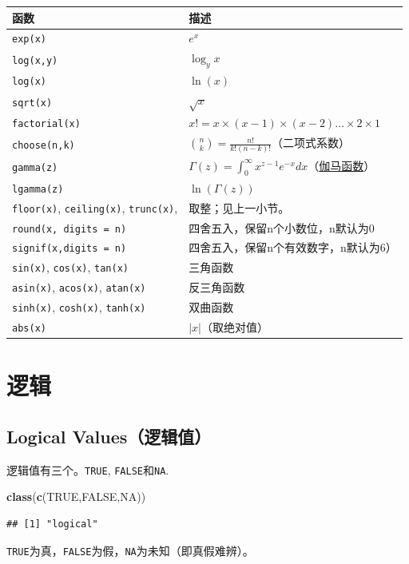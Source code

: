 \documentclass[]{book}
\newenvironment{Shaded}{\begin{snugshade}}{\end{snugshade}}
\newcommand{\KeywordTok}[1]{\textcolor[rgb]{0.13,0.29,0.53}{\textbf{#1}}}
\newcommand{\NormalTok}[1]{#1}
\newcommand{\OtherTok}[1]{\textcolor[rgb]{0.56,0.35,0.01}{#1}}
\begin{document}
\begin{longtable}[]{@{}ll@{}}
\toprule
函数 & 描述\tabularnewline
\midrule
\endhead
\texttt{exp(x)} & \(e^x\)\tabularnewline
\texttt{log(x,y)} & \(\log_yx\)\tabularnewline
\texttt{log(x)} & \(\ln(x)\)\tabularnewline
\texttt{sqrt(x)} & \(\sqrt{x}\)\tabularnewline
\texttt{factorial(x)} & \(x!=x\times(x-1)\times(x-2)\ldots\times2\times1\)\tabularnewline
\texttt{choose(n,k)} & \(\binom{n}{k}=\frac{n!}{k!(n-k)!}\)（二项式系数）\tabularnewline
\texttt{gamma(z)} & \(\Gamma(z)=\int_0^\infty x^{z-1}e^{-x}dx\)（\href{https://en.wikipedia.org/wiki/Gamma_function}{伽马函数}）\tabularnewline
\texttt{lgamma(z)} & \(\ln(\Gamma(z))\)\tabularnewline
\texttt{floor(x)}, \texttt{ceiling(x)}, \texttt{trunc(x)}, & 取整；见上一小节。\tabularnewline
\texttt{round(x,\ digits\ =\ n)} & 四舍五入，保留n个小数位，n默认为0\tabularnewline
\texttt{signif(x,digits\ =\ n)} & 四舍五入，保留n个有效数字，n默认为6）\tabularnewline
\texttt{sin(x)}, \texttt{cos(x)}, \texttt{tan(x)} & 三角函数\tabularnewline
\texttt{asin(x)}, \texttt{acos(x)}, \texttt{atan(x)} & 反三角函数\tabularnewline
\texttt{sinh(x)}, \texttt{cosh(x)}, \texttt{tanh(x)} & 双曲函数\tabularnewline
\texttt{abs(x)} & \(|x|\)（取绝对值）\tabularnewline
\bottomrule
\end{longtable}

\hypertarget{logical-operation}{%
\section{逻辑}\label{logical-operation}}

\hypertarget{logical-values}{%
\subsection{Logical Values（逻辑值）}\label{logical-values}}

逻辑值有三个。\texttt{TRUE}, \texttt{FALSE}和\texttt{NA}.

\begin{Shaded}
\begin{Highlighting}[]
\KeywordTok{class}\NormalTok{(}\KeywordTok{c}\NormalTok{(}\OtherTok{TRUE}\NormalTok{,}\OtherTok{FALSE}\NormalTok{,}\OtherTok{NA}\NormalTok{))}
\end{Highlighting}
\end{Shaded}

\begin{verbatim}
## [1] "logical"
\end{verbatim}

\texttt{TRUE}为真，\texttt{FALSE}为假，\texttt{NA}为未知（即真假难辨）。
\end{document}
